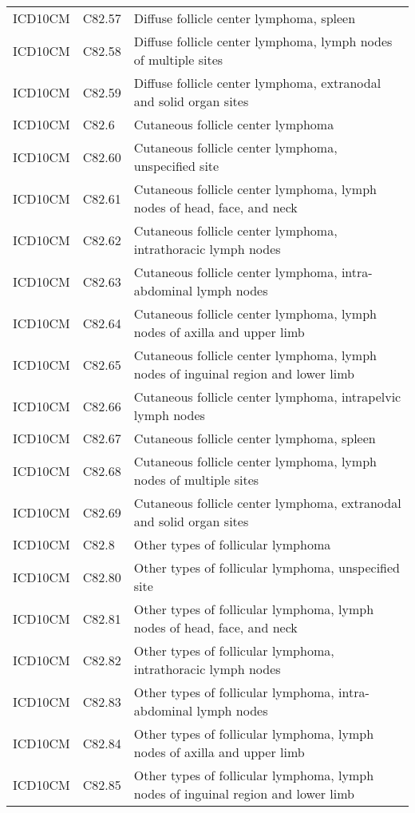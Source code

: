 \begin{longtable}{p{}p{}p{}}
  ICD10CM & C82.57 & Diffuse follicle center lymphoma, spleen \\ 
  ICD10CM & C82.58 & Diffuse follicle center lymphoma, lymph nodes of multiple sites \\ 
  ICD10CM & C82.59 & Diffuse follicle center lymphoma, extranodal and solid organ sites \\ 
  ICD10CM & C82.6 & Cutaneous follicle center lymphoma \\ 
  ICD10CM & C82.60 & Cutaneous follicle center lymphoma, unspecified site \\ 
  ICD10CM & C82.61 & Cutaneous follicle center lymphoma, lymph nodes of head, face, and neck \\ 
  ICD10CM & C82.62 & Cutaneous follicle center lymphoma, intrathoracic lymph nodes \\ 
  ICD10CM & C82.63 & Cutaneous follicle center lymphoma, intra-abdominal lymph nodes \\ 
  ICD10CM & C82.64 & Cutaneous follicle center lymphoma, lymph nodes of axilla and upper limb \\ 
  ICD10CM & C82.65 & Cutaneous follicle center lymphoma, lymph nodes of inguinal region and lower limb \\ 
  ICD10CM & C82.66 & Cutaneous follicle center lymphoma, intrapelvic lymph nodes \\ 
  ICD10CM & C82.67 & Cutaneous follicle center lymphoma, spleen \\ 
  ICD10CM & C82.68 & Cutaneous follicle center lymphoma, lymph nodes of multiple sites \\ 
  ICD10CM & C82.69 & Cutaneous follicle center lymphoma, extranodal and solid organ sites \\ 
  ICD10CM & C82.8 & Other types of follicular lymphoma \\ 
  ICD10CM & C82.80 & Other types of follicular lymphoma, unspecified site \\ 
  ICD10CM & C82.81 & Other types of follicular lymphoma, lymph nodes of head, face, and neck \\ 
  ICD10CM & C82.82 & Other types of follicular lymphoma, intrathoracic lymph nodes \\ 
  ICD10CM & C82.83 & Other types of follicular lymphoma, intra-abdominal lymph nodes \\ 
  ICD10CM & C82.84 & Other types of follicular lymphoma, lymph nodes of axilla and upper limb \\ 
  ICD10CM & C82.85 & Other types of follicular lymphoma, lymph nodes of inguinal region and lower limb \\ 

\end{longtable}
